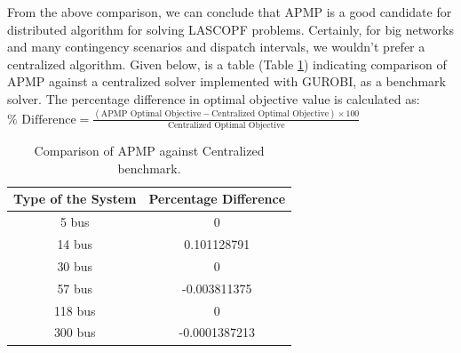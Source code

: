 \documentclass[preprint,12pt,3p]{elsarticle}
\begin{document}
	From the above comparison, we can conclude that APMP is a good candidate for distributed algorithm for solving LASCOPF problems. Certainly, for big networks and many contingency scenarios and dispatch intervals, we wouldn't prefer a centralized algorithm. Given below, is a table (Table \ref{table:APMPCentComp}) indicating comparison of APMP against a centralized solver implemented with GUROBI, as a benchmark solver. The percentage difference in optimal objective value is calculated as:\\
	$\%\text{ Difference}=\frac{(\text{APMP Optimal Objective}-\text{Centralized Optimal Objective})\times 100}{\text{Centralized Optimal Objective}}$
	\begin{table}[ht] 
		
		\caption{Comparison of APMP against Centralized benchmark.} %
		
		\centering %
		
		\begin{tabular}{| c | c |} %
			
			\hline\hline %
			
			Type of the System & Percentage Difference \\ [0.5ex] %
			
			
			\hline %
			
			5 bus &	0 \\ [0.5ex] %
			\hline
			14 bus & 0.101128791 \\ [0.5ex] %
			\hline
			30 bus &	0 \\ [0.5ex] %
			\hline
			57 bus &	-0.003811375 \\ [0.5ex] %
			\hline
			118 bus &	0 \\ [0.5ex] %
			\hline
			300 bus &	-0.0001387213 \\ [0.5ex] %
			\hline
		\end{tabular} 
		
		\label{table:APMPCentComp} %
		
	\end{table}
\end{document}
